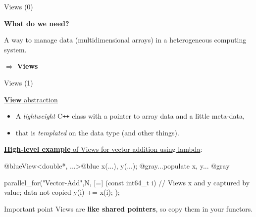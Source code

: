 
\begin{frame}[fragile]{Views (0)}

  {\Large \textbf{What do we need?}}

  \vspace{10pt}

  A way to manage data (multidimensional arrays) in a heterogeneous computing system.

  \vspace{10pt}

  {\Large $\Rightarrow$ \textbf{Views}}

\end{frame}


\begin{frame}[fragile]{Views (1)}

  \ul{\textbf{View} abstraction}
  \begin{itemize}
  \item {A \textit{lightweight} C\texttt{++} class with a pointer to array data and a little meta-data,}
  \item {that is \textit{templated} on the data type (and other things).}
  \end{itemize}

  \vspace{5pt}

  \ul{\textbf{High-level example} of Views for vector addition using lambda}:

  \begin{code}[frame=single, keywords={}]
@blueView<double*, ...>@blue x(...), y(...);
@gray...populate x, y... @gray

parallel_for("Vector-Add",N, [=] (const int64_t i) {
    // Views x and y captured by value; data not copied
    y(i) += x(i);
  });
  \end{code}

  \pause
  \vspace{0pt}

  \begin{block}{Important point}
    Views are \textbf{like shared pointers}, so copy them in your functors.
  \end{block}

  \vspace{5pt}

\end{frame}

